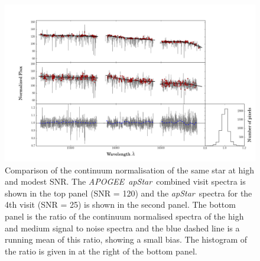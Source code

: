 \documentclass[12pt, preprint]{aastex}
\newcommand{\apogee}{\textsl{APOGEE}}
\newcommand{\apstar}{\textsl{apStar}}
\begin{document}
 \begin{figure}[!h]
  \includegraphics[width=\hsize]{./plots/SNR_continuum5.png}
  \caption{Comparison of the continuum normalisation of the same star at high and modest SNR. The \apogee\ \apstar\ combined visit spectra is shown in the top panel (SNR = 120) and the \apstar\ spectra for the 4th visit (SNR = 25) is shown in the second panel. The bottom panel is the ratio of the continuum normalised spectra of the high and medium signal to noise spectra and the blue dashed line is a running mean of this ratio, showing a small bias. The histogram of the ratio is given in at the right of the bottom panel.}
\label{fig:lowsnr}
\end{figure}
\end{document}
